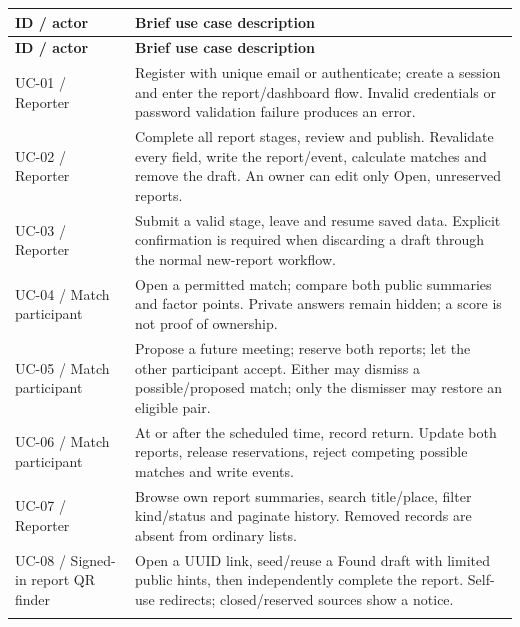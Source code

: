 \documentclass[12pt,a4paper,oneside]{report}
\begin{document}
\begin{longtable}{@{}P{0.26\dimexpr\textwidth-12pt\relax}P{0.74\dimexpr\textwidth-12pt\relax}@{}}

\toprule \textbf{ID / actor} & \textbf{Brief use case description} \\ \midrule\endfirsthead

\toprule \textbf{ID / actor} & \textbf{Brief use case description} \\ \midrule\endhead

\bottomrule\endfoot

UC-01 / Reporter & Register with unique email or authenticate; create a session and enter the report/dashboard flow. Invalid credentials or password validation failure produces an error. \\ \addlinespace[3pt]

UC-02 / Reporter & Complete all report stages, review and publish. Revalidate every field, write the report/event, calculate matches and remove the draft. An owner can edit only Open, unreserved reports. \\ \addlinespace[3pt]

UC-03 / Reporter & Submit a valid stage, leave and resume saved data. Explicit confirmation is required when discarding a draft through the normal new-report workflow. \\ \addlinespace[3pt]

UC-04 / Match participant & Open a permitted match; compare both public summaries and factor points. Private answers remain hidden; a score is not proof of ownership. \\ \addlinespace[3pt]

UC-05 / Match participant & Propose a future meeting; reserve both reports; let the other participant accept. Either may dismiss a possible/proposed match; only the dismisser may restore an eligible pair. \\ \addlinespace[3pt]

UC-06 / Match participant & At or after the scheduled time, record return. Update both reports, release reservations, reject competing possible matches and write events. \\ \addlinespace[3pt]

UC-07 / Reporter & Browse own report summaries, search title/place, filter kind/status and paginate history. Removed records are absent from ordinary lists. \\ \addlinespace[3pt]

UC-08 / Signed-in report QR finder & Open a UUID link, seed/reuse a Found draft with limited public hints, then independently complete the report. Self-use redirects; closed/reserved sources show a notice. \\ \addlinespace[3pt]


\end{longtable}
\end{document}
